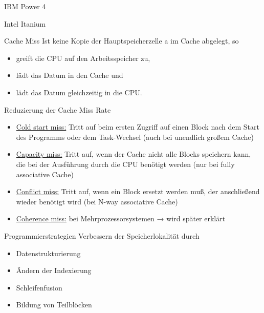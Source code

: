 \begin{bonus}[Cache]{IBM Power 4}

\end{bonus}

\begin{bonus}[Cache]{Intel Itanium}

\end{bonus}

\begin{defi}{Cache Miss}
  Ist keine Kopie der Hauptspeicherzelle a im Cache abgelegt, so
  \begin{itemize}
    \item greift die CPU auf den Arbeitsspeicher zu,
    \item lädt das Datum in den Cache und
    \item lädt das Datum gleichzeitig in die CPU.
  \end{itemize}
\end{defi}

\begin{defi}{Reduzierung der Cache Miss Rate}
  \begin{itemize}
    \item \underline{Cold start miss:} Tritt auf beim ersten Zugriff auf einen Block nach dem Start des Programms oder dem Task-Wechsel (auch bei unendlich großem Cache)
    \item \underline{Capacity miss:} Tritt auf, wenn der Cache nicht alle Blocks speichern kann, die bei der Ausführung durch die CPU benötigt werden (nur bei fully associative Cache)
    \item \underline{Conflict miss:} Tritt auf, wenn ein Block ersetzt werden muß, der anschließend wieder benötigt wird (bei N-way associative Cache)
    \item \underline{Coherence miss:} bei Mehrprozessorsystemen → wird später erklärt
  \end{itemize}
\end{defi}

\begin{defi}{Programmierstrategien}
  Verbessern der Speicherlokalität durch
  \begin{itemize}[\ldots]
    \item Datenstrukturierung
    \item Ändern der Indexierung
    \item Schleifenfusion
    \item Bildung von Teilblöcken
  \end{itemize}
\end{defi}

